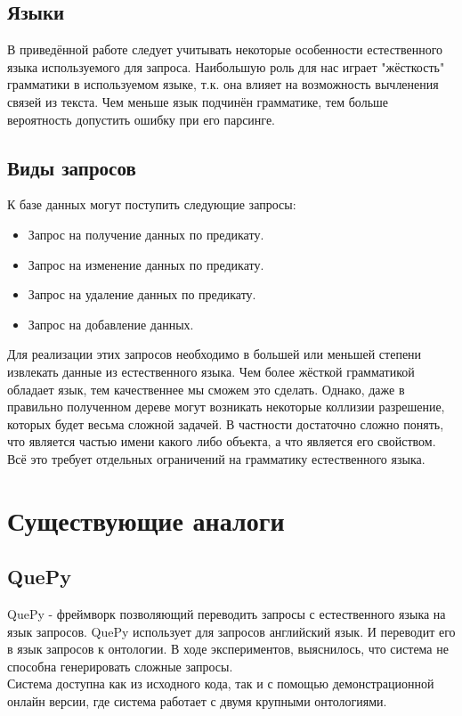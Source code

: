\subsection{Языки}
В приведённой работе следует учитывать некоторые особенности естественного языка используемого для запроса. Наибольшую роль для нас играет "жёсткость" грамматики в используемом языке, т.к. она влияет на возможность вычленения связей из текста. Чем меньше язык подчинён грамматике, тем больше вероятность допустить ошибку при его парсинге.
\subsection{Виды запросов}
К базе данных могут поступить следующие запросы:
\begin{itemize}
\item Запрос на получение данных по предикату.
\item Запрос на изменение данных по предикату.
\item Запрос на удаление данных по предикату.
\item Запрос на добавление данных.
\end{itemize}
Для реализации этих запросов необходимо в большей или меньшей степени извлекать данные из естественного языка. Чем более жёсткой грамматикой обладает язык, тем качественнее мы сможем это сделать. Однако, даже в правильно полученном дереве могут возникать некоторые коллизии разрешение, которых будет весьма сложной задачей. В частности достаточно сложно понять, что является частью имени какого либо объекта, а что является его свойством.
Всё это требует отдельных ограничений на грамматику естественного языка.

\section{Существующие аналоги}
\subsection{QuePy}
QuePy - фреймворк позволяющий переводить запросы с естественного языка на язык запросов.
QuePy использует для запросов английский язык. И переводит его в язык запросов к онтологии. В ходе экспериментов, выяснилось, что система не способна генерировать сложные запросы. \\
Система доступна как из исходного кода, так и с помощью демонстрационной онлайн версии, где система работает с двумя крупными онтологиями.\cite{quepy}
